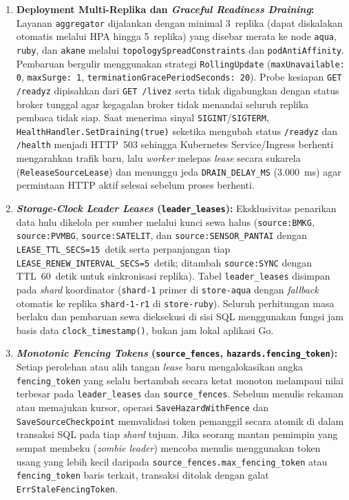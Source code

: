 \begin{enumerate}
    \item \textbf{Deployment Multi-Replika dan \textit{Graceful Readiness Draining}:} Layanan \texttt{aggregator} dijalankan dengan minimal 3~replika (dapat diskalakan otomatis melalui HPA hingga 5~replika) yang disebar merata ke node \texttt{aqua}, \texttt{ruby}, dan \texttt{akane} melalui \texttt{topologySpreadConstraints} dan \texttt{podAntiAffinity}. Pembaruan bergulir menggunakan strategi \texttt{RollingUpdate} (\texttt{maxUnavailable: 0}, \texttt{maxSurge: 1}, \texttt{terminationGracePeriodSeconds: 20}). Probe kesiapan \texttt{GET /readyz} dipisahkan dari \texttt{GET /livez} serta tidak digabungkan dengan status broker tunggal agar kegagalan broker tidak menandai seluruh replika pembaca tidak siap. Saat menerima sinyal \texttt{SIGINT}/\texttt{SIGTERM}, \texttt{HealthHandler.SetDraining(true)} seketika mengubah status \texttt{/readyz} dan \texttt{/health} menjadi HTTP~503 sehingga Kubernetes Service/Ingress berhenti mengarahkan trafik baru, lalu \textit{worker} melepas \textit{lease} secara sukarela (\texttt{ReleaseSourceLease}) dan menunggu jeda \texttt{DRAIN\_DELAY\_MS} (3.000~ms) agar permintaan HTTP aktif selesai sebelum proses berhenti.
    \item \textbf{\textit{Storage-Clock Leader Leases} (\texttt{leader\_leases}):} Eksklusivitas penarikan data hulu dikelola per sumber melalui kunci sewa halus (\texttt{source:BMKG}, \texttt{source:PVMBG}, \texttt{source:SATELIT}, dan \texttt{source:SENSOR\_PANTAI} dengan \texttt{LEASE\_TTL\_SECS=15}~detik serta perpanjangan tiap \texttt{LEASE\_RENEW\_}\allowbreak\texttt{INTERVAL\_SECS=5}~detik; ditambah \texttt{source:SYNC} dengan TTL~60~detik untuk sinkronisasi replika). Tabel \texttt{leader\_leases} disimpan pada \textit{shard} koordinator (\texttt{shard-1} primer di \texttt{store-aqua} dengan \textit{fallback} otomatis ke replika \texttt{shard-1-r1} di \texttt{store-ruby}). Seluruh perhitungan masa berlaku dan pembaruan sewa dieksekusi di sisi SQL menggunakan fungsi jam basis data \texttt{clock\_timestamp()}, bukan jam lokal aplikasi Go.
    \item \textbf{\textit{Monotonic Fencing Tokens} (\texttt{source\_fences}, \texttt{hazards.fencing\_token}):} Setiap perolehan atau alih tangan \textit{lease} baru mengalokasikan angka \texttt{fencing\_token} yang selalu bertambah secara ketat monoton melampaui nilai terbesar pada \texttt{leader\_leases} dan \texttt{source\_fences}. Sebelum menulis rekaman atau memajukan kursor, operasi \texttt{SaveHazardWithFence} dan \texttt{SaveSourceCheckpoint} memvalidasi token pemanggil secara atomik di dalam transaksi SQL pada tiap \textit{shard} tujuan. Jika seorang mantan pemimpin yang sempat membeku (\textit{zombie leader}) mencoba menulis menggunakan token usang yang lebih kecil daripada \texttt{source\_fences.max\_fencing\_token} atau \texttt{fencing\_token} baris terkait, transaksi ditolak dengan galat \texttt{ErrStaleFencingToken}.

\end{enumerate}
